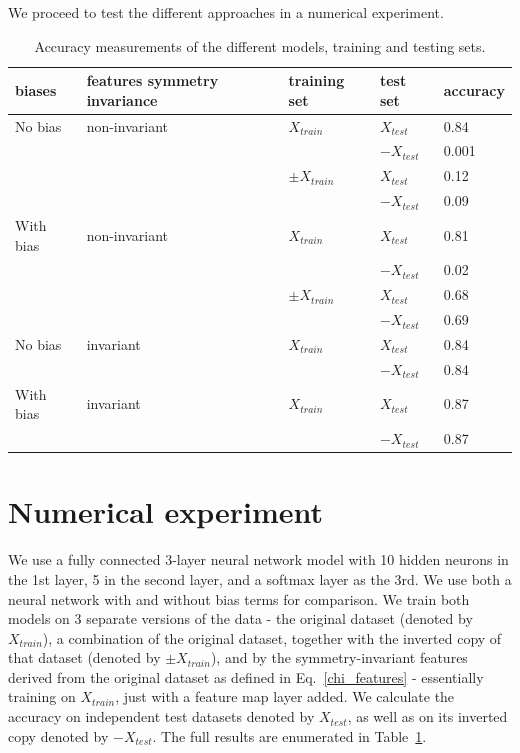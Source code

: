 \documentclass[twocolumn, prl, nofootinbib]{revtex4-1}
\begin{document}
We proceed to test the different approaches in a numerical experiment.


\begin{table}
\label{table:results_table}
\begin{tabular}{l p{2.8cm} p{1.5cm} p{1.5cm} | l}
	biases & features symmetry invariance & training set & test set & accuracy \\ 
	\hline
	No bias & non-invariant & $X_{train}$ & $X_{test}$ & 0.84 \\
	 &  &  & $-X_{test}$ & 0.001 \\ 
	\cline{3-5}
	 &  & $\pm X_{train}$ & $X_{test}$ & 0.12 \\
	 &  &  & $-X_{test}$ & 0.09 \\ 
	\hline	
	With bias & non-invariant & $X_{train}$ & $X_{test}$ & 0.81 \\
	 &  &  & $-X_{test}$ & 0.02 \\ 
	\cline{3-5}
	 &  & $\pm X_{train}$ & $X_{test}$ & 0.68 \\
	 &  &  & $-X_{test}$ & 0.69 \\ 
	\hline
	No bias & invariant & $X_{train}$ & $X_{test}$ & 0.84 \\
	 &  &  & $-X_{test}$ & 0.84 \\ 
	\hline
	With bias & invariant & $X_{train}$ & $X_{test}$ & 0.87 \\
	 &  &  & $-X_{test}$ & 0.87 \\ 
	\hline
\end{tabular}
\caption{Accuracy measurements of the different models, training and testing sets.} 
\end{table}


\section{Numerical experiment}
\label{Sec:empirics}

We use a fully connected 3-layer neural network model with 10 hidden neurons in the 1st layer, 5 in the second layer, and a softmax layer as the 3rd.
We use both a neural network with and without bias terms for comparison. We train both models on 3 separate  versions of the data - the original dataset (denoted by $X_{train}$), a combination of the original dataset, together with the inverted copy of that dataset (denoted by $\pm X_{train}$), and by the symmetry-invariant features derived from the original dataset as defined in Eq.~\eqref{chi_features} - essentially training on $X_{train}$, just with a feature map layer added. We calculate the accuracy on independent test datasets denoted by $X_{test}$, as well as on its inverted copy denoted by $-X_{test}$. The full results are enumerated in Table~\ref{table:results_table}.
\end{document}
